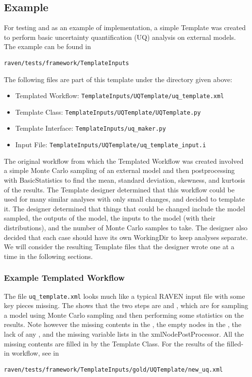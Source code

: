 \subsection{Example}
For testing and as an example of implementation, a simple Template was created to perform basic uncertainty quantification (UQ) analysis on external models. The example can be found in
\begin{lstlisting}[language=bash]
 raven/tests/framework/TemplateInputs
\end{lstlisting}
The following files are part of this template under the directory given above:
\begin{itemize}
  \item Templated Workflow: \texttt{TemplateInputs/UQTemplate/uq\_template.xml}
  \item Template Class: \texttt{TemplateInputs/UQTemplate/UQTemplate.py}
  \item Template Interface: \texttt{TemplateInputs/uq\_maker.py}
  \item Input File: \texttt{TemplateInputs/UQTemplate/uq\_template\_input.i}
\end{itemize}
The original workflow from which the Templated Workflow was created involved a simple Monte Carlo sampling of an external model and then postprocessing with BasicStatistics to find the mean, standard deviation, skewness, and kurtosis of the results. The Template designer determined that this workflow could be used for many similar analyses with only small changes, and decided to template it. The designer determined that things that could be changed include the model sampled, the outputs of the model, the inputs to the model (with their distributions), and the number of Monte Carlo samples to take. The designer also decided that each case should have its own WorkingDir to keep analyses separate. We will consider the resulting Template files that the designer wrote one at a time in the following sections.



\subsubsection{Example Templated Workflow}
The file \texttt{uq\_template.xml} looks much like a typical RAVEN input file with some key pieces missing. The  shows that the two steps are  and , which are for sampling a model using Monte Carlo sampling and then performing some statistics on the results. Note however the missing contents in the , the empty nodes in the , the lack of any , and the missing variable lists in the xmlNode{PostProcessor}. All the missing contents are filled in by the Template Class. For the results of the filled-in workflow, see in
\begin{lstlisting}[language=bash]
 raven/tests/framework/TemplateInputs/gold/UQTemplate/new_uq.xml
\end{lstlisting}



